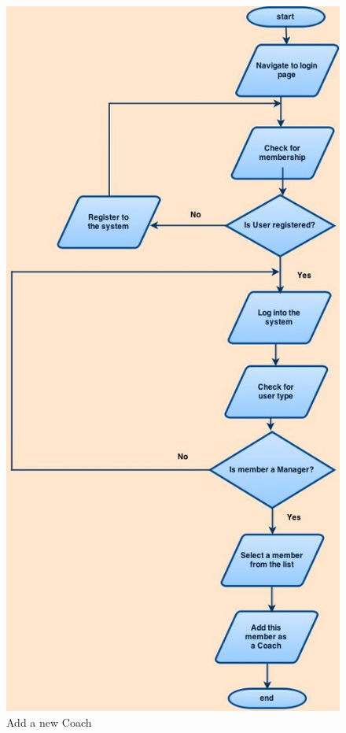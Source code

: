 \documentclass{l3proj}
\begin{document}
\pagebreak

{
\begin{figure}[h]
\caption{Add a new Coach}
\centering
\includegraphics[scale=0.30]{Manager(AddCoach).jpg}
\end{figure}
}
\end{document}
